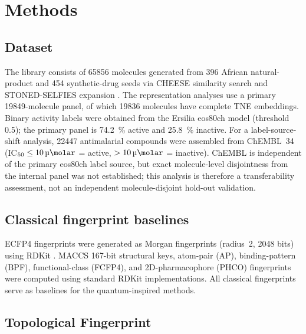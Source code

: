 \documentclass[pdflatex,sn-mathphys-num]{sn-jnl}%
\begin{document}

\section{Methods}\label{sec:methods}

\subsection{Dataset}\label{sec:methods_dataset}

The library consists of \num{65856} molecules generated from \num{396} African natural-product and \num{454} synthetic-drug seeds via CHEESE similarity search \cite{lzicar_cheese_2024} and STONED-SELFIES expansion \cite{Nigam2021}. The representation analyses use a primary \num{19849}-molecule panel, of which \num{19836} molecules have complete TNE embeddings. Binary activity labels were obtained from the Ersilia eos80ch model (threshold \num{0.5}); the primary panel is \qty{74.2}{\percent} active and \qty{25.8}{\percent} inactive. For a label-source-shift analysis, \num{22447} antimalarial compounds were assembled from ChEMBL~34 (IC$_{50} \leq \SI{10}{\micro\molar}$ = active, $> \SI{10}{\micro\molar}$ = inactive). ChEMBL is independent of the primary eos80ch label source, but exact molecule-level disjointness from the internal panel was not established; this analysis is therefore a transferability assessment, not an independent molecule-disjoint hold-out validation.

\subsection{Classical fingerprint baselines}

ECFP4 fingerprints were generated as Morgan fingerprints (radius~2, \num{2048} bits) using RDKit \cite{rdkit_2024}. MACCS \num{167}-bit structural keys, atom-pair (AP), binding-pattern (BPF), functional-class (FCFP4), and 2D-pharmacophore (PHCO) fingerprints were computed using standard RDKit implementations. All classical fingerprints serve as baselines for the quantum-inspired methods.

\subsection{Topological Fingerprint}
\end{document}
